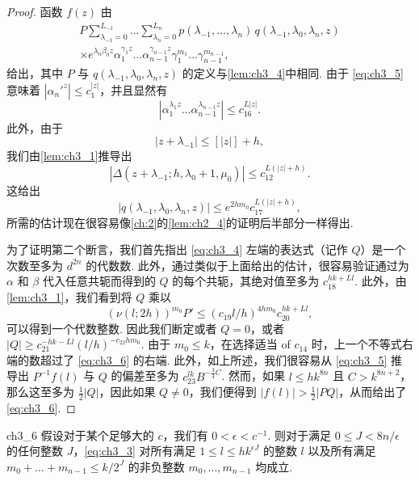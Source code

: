 \begin{proof}
函数 $f(z)$ 由
\begin{align*}
P \sum_{\lambda_{-1}=0}^{L_{-1}} \dots \sum_{\lambda_n=0}^{L_n} p(\lambda_{-1}, \dots, \lambda_n) \, q(\lambda_{-1}, \lambda_0, \lambda_n, z) \\
\times e^{\lambda_n \beta_0 z} \alpha_1^{\gamma_1 z} \dots \alpha_{n-1}^{\gamma_{n-1} z} \gamma_1^{m_1} \dots \gamma_{n-1}^{m_{n-1}},
\end{align*}
给出，其中 $P$ 与 $q(\lambda_{-1}, \lambda_0, \lambda_n, z)$ 的定义与\autoref{lem:ch3_4}中相同. 由于 \eqref{eq:ch3_5} 意味着 $|\alpha_n'^z| \le c_1^{|z|}$，并且显然有
\[
\left|\alpha_1^{\lambda_1 z} \dots \alpha_{n-1}^{\lambda_{n-1} z}\right| \le c_{16}^{L|z|}.
\]
此外，由于
\[
|z+\lambda_{-1}| \le [|z|]+h,
\]
我们由\autoref{lem:ch3_1}推导出
\[
|\Delta(z+\lambda_{-1}; h, \lambda_0+1, \mu_0)| \le c_{12}^{L(|z|+h)}.
\]
这给出
\[
|q(\lambda_{-1}, \lambda_0, \lambda_n, z)| \le e^{2hm_0} c_{17}^{L(|z|+h)},
\]
所需的估计现在很容易像\autoref{ch:2}的\autoref{lem:ch2_4}的证明后半部分一样得出.

为了证明第二个断言，我们首先指出 \eqref{eq:ch3_4} 左端的表达式（记作 $Q$）是一个次数至多为 $d^{2n}$ 的代数数. 此外，通过类似于上面给出的估计，很容易验证通过为 $\alpha$ 和 $\beta$ 代入任意共轭而得到的 $Q$ 的每个共轭，其绝对值至多为 $c_{18}^{hk+Ll}$. 此外，由\autoref{lem:ch3_1}，我们看到将 $Q$ 乘以
\[
(\nu(l;2h))^{m_0} P' \le (c_{19} l/h)^{4hm_0} c_{20}^{hk+Ll},
\]
可以得到一个代数整数. 因此我们断定或者 $Q=0$，或者 $|Q| \ge c_{21}^{-hk-Ll} (l/h)^{-c_{22}hm_0}$.
由于 $m_0 \le k$，在选择适当 of $c_{14}$ 时，上一个不等式右端的数超过了 \eqref{eq:ch3_6} 的右端. 此外，如上所述，我们很容易从 \eqref{eq:ch3_5} 推导出 $P^{-1} f(l)$ 与 $Q$ 的偏差至多为 $c_{23}^{lk} B^{-\frac{3}{4}C}$. 然而，如果 $l \le hk^{8n}$ 且 $C > k^{8n+2}$，那么这至多为 $\frac{1}{2}|Q|$，因此如果 $Q \neq 0$，我们便得到 $|f(l)| > \frac{1}{2}|PQ|$，从而给出了 \eqref{eq:ch3_6}.
\end{proof}

\begin{mylemma}{}{ch3_6}
假设对于某个足够大的 $c$，我们有 $0 < \epsilon < c^{-1}$. 则对于满足 $0 \le J < 8n/\epsilon$ 的任何整数 $J$，\eqref{eq:ch3_3} 对所有满足 $1 \le l \le h k^{\epsilon J}$ 的整数 $l$ 以及所有满足 $m_0 + \dots + m_{n-1} \le k/2^J$ 的非负整数 $m_0, \dots, m_{n-1}$ 均成立.
\end{mylemma}

